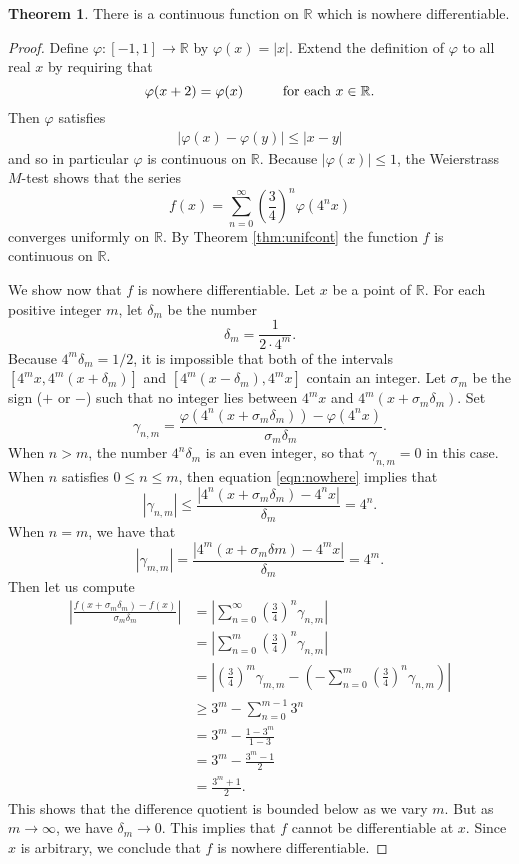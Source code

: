 \documentclass[12pt]{article}
\theoremstyle{definition}
\theoremstyle{theorem}
\newtheorem{theorem}[definition]{Theorem}
\begin{document}
\begin{theorem}
There is a continuous function on $\mathbb{R}$ which is nowhere differentiable. 
\end{theorem}

\begin{proof}
Define $\varphi : [-1,1] \to \mathbb{R}$ by $\varphi(x) = |x|$. Extend the definition of $\varphi$ to all real $x$ by requiring that 
\[
\varphi(x+2) = \varphi(x) \hspace{10mm} \text{for each $x \in \mathbb{R}$.}
\]
Then $\varphi$ satisfies 
\begin{align}\label{eqn:nowhere}
|\varphi(x) - \varphi(y)| \leqslant |x - y|
\end{align}
and so in particular $\varphi$ is continuous on $\mathbb{R}$. Because $|\varphi(x)| \leqslant 1$, the Weierstrass $M$-test shows that the series  
\[
f(x) = \sum_{n=0}^\infty \left(\frac{3}{4}\right)^n \varphi(4^n x)
\]
converges uniformly on $\mathbb{R}$. By Theorem \ref{thm:unifcont} the function $f$ is continuous on $\mathbb{R}$. 

We show now that $f$ is nowhere differentiable. Let $x$ be a point of $\mathbb{R}$. For each positive integer $m$, let $\delta_m$ be the number 
\[
\delta_m = \frac{1}{2 \cdot 4^m}.
\]
Because $4^m\delta_m = 1/2$, it is impossible that both of the intervals $[4^mx, 4^m(x + \delta_m)]$ and $[4^m(x - \delta_m), 4^mx]$ contain an integer. Let $\sigma_m$ be the sign ($+$ or $-$) such that no integer lies between $4^mx$ and $4^m(x + \sigma_m\delta_m)$. Set 
\[
\gamma_{n,m} = \frac{\varphi(4^n(x + \sigma_m \delta_m)) - \varphi(4^nx)}{\sigma_m \delta_m}.
\]
When $n > m$, the number $4^n\delta_m$ is an even integer, so that $\gamma_{n,m} = 0$ in this case. When $n$ satisfies $0 \leqslant n \leqslant m$, then equation \eqref{eqn:nowhere} implies that 
\[
|\gamma_{n,m}| \leqslant \frac{|4^n(x + \sigma_m\delta_m) - 4^nx|}{\delta_m} = 4^n.
\]
When $n = m$, we have that 
\[
|\gamma_{m,m}| = \frac{|4^m(x + \sigma_m \delta m) - 4^m x|}{\delta_m} = 4^m.
\]
Then let us compute 
\begin{align*}
\left|\frac{f(x + \sigma_m \delta_m) - f(x)}{\sigma_m\delta_m}\right| &= \left|\sum_{n=0}^\infty \left(\frac{3}{4}\right)^n \gamma_{n,m} \right| \\
&= \left|\sum_{n=0}^m \left(\frac{3}{4}\right)^n \gamma_{n,m} \right| \\
&= \left|\left(\frac{3}{4}\right)^m \gamma_{m,m} - \left(-\sum_{n=0}^m \left(\frac{3}{4}\right)^n \gamma_{n,m}\right) \right| \\
&\geqslant 3^m - \sum_{n=0}^{m-1} 3^n  \\
&= 3^m - \frac{1-3^m}{1-3} \\
&= 3^m - \frac{3^m-1}{2} \\
&= \frac{3^m + 1}{2}.
\end{align*}
This shows that the difference quotient is bounded below as we vary $m$. But as $m \to \infty$, we have $\delta_m \to 0$. This implies that $f$ cannot be differentiable at $x$. Since $x$ is arbitrary, we conclude that $f$ is nowhere differentiable. 
\end{proof}
\end{document}
